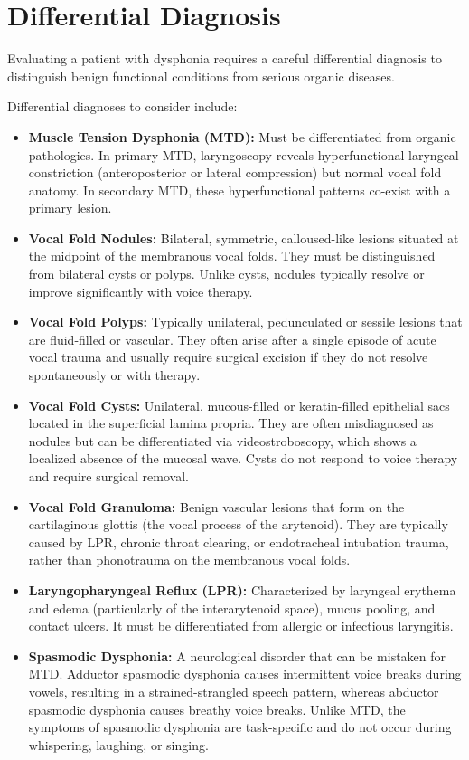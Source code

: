 \section*{Differential Diagnosis}
Evaluating a patient with dysphonia requires a careful differential diagnosis to distinguish benign functional conditions from serious organic diseases.

Differential diagnoses to consider include:
\begin{itemize}
    \item \textbf{Muscle Tension Dysphonia (MTD):} Must be differentiated from organic pathologies. In primary MTD, laryngoscopy reveals hyperfunctional laryngeal constriction (anteroposterior or lateral compression) but normal vocal fold anatomy. In secondary MTD, these hyperfunctional patterns co-exist with a primary lesion.
    \item \textbf{Vocal Fold Nodules:} Bilateral, symmetric, calloused-like lesions situated at the midpoint of the membranous vocal folds. They must be distinguished from bilateral cysts or polyps. Unlike cysts, nodules typically resolve or improve significantly with voice therapy.
    \item \textbf{Vocal Fold Polyps:} Typically unilateral, pedunculated or sessile lesions that are fluid-filled or vascular. They often arise after a single episode of acute vocal trauma and usually require surgical excision if they do not resolve spontaneously or with therapy.
    \item \textbf{Vocal Fold Cysts:} Unilateral, mucous-filled or keratin-filled epithelial sacs located in the superficial lamina propria. They are often misdiagnosed as nodules but can be differentiated via videostroboscopy, which shows a localized absence of the mucosal wave. Cysts do not respond to voice therapy and require surgical removal.
    \item \textbf{Vocal Fold Granuloma:} Benign vascular lesions that form on the cartilaginous glottis (the vocal process of the arytenoid). They are typically caused by LPR, chronic throat clearing, or endotracheal intubation trauma, rather than phonotrauma on the membranous vocal folds.
    \item \textbf{Laryngopharyngeal Reflux (LPR):} Characterized by laryngeal erythema and edema (particularly of the interarytenoid space), mucus pooling, and contact ulcers. It must be differentiated from allergic or infectious laryngitis.
    \item \textbf{Spasmodic Dysphonia:} A neurological disorder that can be mistaken for MTD. Adductor spasmodic dysphonia causes intermittent voice breaks during vowels, resulting in a strained-strangled speech pattern, whereas abductor spasmodic dysphonia causes breathy voice breaks. Unlike MTD, the symptoms of spasmodic dysphonia are task-specific and do not occur during whispering, laughing, or singing.

\end{itemize}
